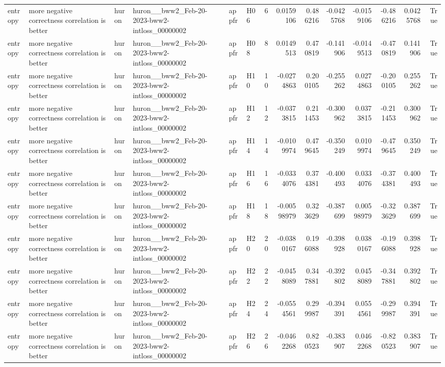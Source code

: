 \begin{longtable}{llllllrrrrrrrr}
entropy & more negative correctness correlation is better & huron & huron\_\_bww2\_Feb-20-2023-bww2-intloss\_00000002 & appfr & H06 & 6 & 0.0159106 & 0.486216 & -0.0425768 & -0.0159106 & -0.486216 & 0.0425768 & True \\
entropy & more negative correctness correlation is better & huron & huron\_\_bww2\_Feb-20-2023-bww2-intloss\_00000002 & appfr & H08 & 8 & 0.0149513 & 0.470819 & -0.141906 & -0.0149513 & -0.470819 & 0.141906 & True \\
entropy & more negative correctness correlation is better & huron & huron\_\_bww2\_Feb-20-2023-bww2-intloss\_00000002 & appfr & H10 & 10 & -0.0274863 & 0.200105 & -0.255262 & 0.0274863 & -0.200105 & 0.255262 & True \\
entropy & more negative correctness correlation is better & huron & huron\_\_bww2\_Feb-20-2023-bww2-intloss\_00000002 & appfr & H12 & 12 & -0.0373815 & 0.211453 & -0.300962 & 0.0373815 & -0.211453 & 0.300962 & True \\
entropy & more negative correctness correlation is better & huron & huron\_\_bww2\_Feb-20-2023-bww2-intloss\_00000002 & appfr & H14 & 14 & -0.0109974 & 0.479645 & -0.350249 & 0.0109974 & -0.479645 & 0.350249 & True \\
entropy & more negative correctness correlation is better & huron & huron\_\_bww2\_Feb-20-2023-bww2-intloss\_00000002 & appfr & H16 & 16 & -0.0334076 & 0.374381 & -0.400493 & 0.0334076 & -0.374381 & 0.400493 & True \\
entropy & more negative correctness correlation is better & huron & huron\_\_bww2\_Feb-20-2023-bww2-intloss\_00000002 & appfr & H18 & 18 & -0.00598979 & 0.323629 & -0.387699 & 0.00598979 & -0.323629 & 0.387699 & True \\
entropy & more negative correctness correlation is better & huron & huron\_\_bww2\_Feb-20-2023-bww2-intloss\_00000002 & appfr & H20 & 20 & -0.0380167 & 0.196088 & -0.398928 & 0.0380167 & -0.196088 & 0.398928 & True \\
entropy & more negative correctness correlation is better & huron & huron\_\_bww2\_Feb-20-2023-bww2-intloss\_00000002 & appfr & H22 & 22 & -0.0458089 & 0.347881 & -0.392802 & 0.0458089 & -0.347881 & 0.392802 & True \\
entropy & more negative correctness correlation is better & huron & huron\_\_bww2\_Feb-20-2023-bww2-intloss\_00000002 & appfr & H24 & 24 & -0.0554561 & 0.299987 & -0.394391 & 0.0554561 & -0.299987 & 0.394391 & True \\
entropy & more negative correctness correlation is better & huron & huron\_\_bww2\_Feb-20-2023-bww2-intloss\_00000002 & appfr & H26 & 26 & -0.0462268 & 0.820523 & -0.383907 & 0.0462268 & -0.820523 & 0.383907 & True \\

\end{longtable}
